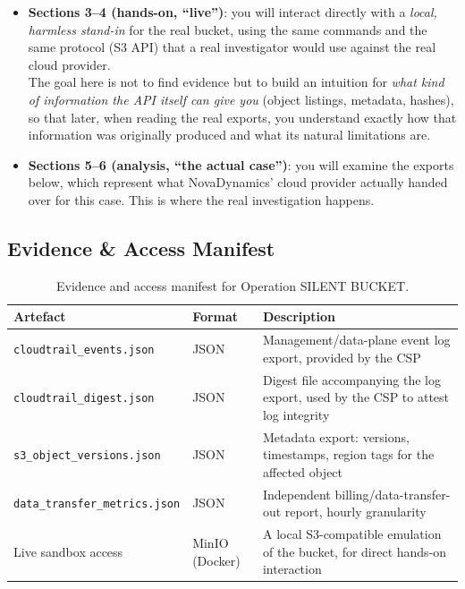 \begin{itemize}[leftmargin=1.2cm]
	\item \textbf{Sections 3--4 (hands-on, ``live'')}: you will interact directly with a
	      \emph{local, harmless stand-in} for the real bucket, using the same commands and the
	      same protocol (S3 API) that a real investigator would use against the real cloud
	      provider.\\
		  The goal here is not to find evidence but to build an intuition for \emph{what kind of information the API itself can give you} (object listings, metadata, hashes), so that later, when reading the real exports, you understand exactly how that information was originally produced and what its natural limitations are.
	\item \textbf{Sections 5--6 (analysis, ``the actual case'')}: you will examine the exports
	      below, which represent what NovaDynamics' cloud provider actually handed over for this
	      case. This is where the real investigation happens.
\end{itemize}

\subsection{Evidence \& Access Manifest}

\begin{table}[H]
	\centering
	\begin{tabularx}{\textwidth}{l | l | X}
		\toprule
		\textbf{Artefact} & \textbf{Format} & \textbf{Description} \\
		\midrule
		\texttt{cloudtrail\_events.json}    & JSON                & Management/data-plane event log export, provided by the CSP \\
		\texttt{cloudtrail\_digest.json}    & JSON                & Digest file accompanying the log export, used by the CSP to attest log integrity \\
		\texttt{s3\_object\_versions.json}  & JSON                & Metadata export: versions, timestamps, region tags for the affected object \\
		\texttt{data\_transfer\_metrics.json} & JSON              & Independent billing/data-transfer-out report, hourly granularity \\
		Live sandbox access                 & MinIO (Docker)      & A local S3-compatible emulation of the bucket, for direct hands-on interaction \\
		\bottomrule
	\end{tabularx}
	\caption{Evidence and access manifest for Operation SILENT BUCKET.}
\end{table}

